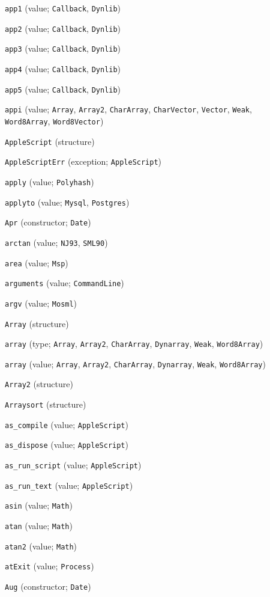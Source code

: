 \begin{description}
\item[] \verb"app1" (value; \verb"Callback", \verb"Dynlib")
\item[] \verb"app2" (value; \verb"Callback", \verb"Dynlib")
\item[] \verb"app3" (value; \verb"Callback", \verb"Dynlib")
\item[] \verb"app4" (value; \verb"Callback", \verb"Dynlib")
\item[] \verb"app5" (value; \verb"Callback", \verb"Dynlib")
\item[] \verb"appi" (value; \verb"Array", \verb"Array2", \verb"CharArray", \verb"CharVector", \verb"Vector", \verb"Weak", \verb"Word8Array", \verb"Word8Vector")
\item[] \verb"AppleScript" (structure)
\item[] \verb"AppleScriptErr" (exception; \verb"AppleScript")
\item[] \verb"apply" (value; \verb"Polyhash")
\item[] \verb"applyto" (value; \verb"Mysql", \verb"Postgres")
\item[] \verb"Apr" (constructor; \verb"Date")
\item[] \verb"arctan" (value; \verb"NJ93", \verb"SML90")
\item[] \verb"area" (value; \verb"Msp")
\item[] \verb"arguments" (value; \verb"CommandLine")
\item[] \verb"argv" (value; \verb"Mosml")
\item[] \verb"Array" (structure)
\item[] \verb"array" (type; \verb"Array", \verb"Array2", \verb"CharArray", \verb"Dynarray", \verb"Weak", \verb"Word8Array")
\item[] \verb"array" (value; \verb"Array", \verb"Array2", \verb"CharArray", \verb"Dynarray", \verb"Weak", \verb"Word8Array")
\item[] \verb"Array2" (structure)
\item[] \verb"Arraysort" (structure)
\item[] \verb"as_compile" (value; \verb"AppleScript")
\item[] \verb"as_dispose" (value; \verb"AppleScript")
\item[] \verb"as_run_script" (value; \verb"AppleScript")
\item[] \verb"as_run_text" (value; \verb"AppleScript")
\item[] \verb"asin" (value; \verb"Math")
\item[] \verb"atan" (value; \verb"Math")
\item[] \verb"atan2" (value; \verb"Math")
\item[] \verb"atExit" (value; \verb"Process")
\item[] \verb"Aug" (constructor; \verb"Date")
\\[2ex]


\end{description}
